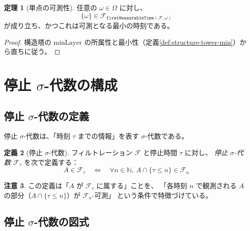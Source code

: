 \documentclass[11pt,a4paper,ja=standard]{ltjsarticle}
\theoremstyle{definition}
\newtheorem{definition}{定義}[section]
\newtheorem{theorem}[definition]{定理}
\newtheorem{remark}[definition]{注意}
\newcommand{\N}{\mathbb{N}}
\newcommand{\F}{\mathcal{F}}
\newcommand{\minLayer}{\mathrm{minLayer}}
\begin{document}
\begin{theorem}[単点の可測性]\label{thm:singleton-measurable}
任意の $\omega \in \Omega$ に対し、
\[
\{\omega\} \in \F_{\mathtt{firstMeasurableTime}(\F, \omega)}
\]
が成り立ち、かつこれは可測となる最小の時刻である。
\end{theorem}

\begin{proof}
構造塔の $\minLayer$ の所属性と最小性（定義\ref{def:structure-tower-min}）から直ちに従う。
\end{proof}

\section{停止 $\sigma$-代数の構成}

\subsection{停止 $\sigma$-代数の定義}

停止 $\sigma$-代数は、「時刻 $\tau$ までの情報」を表す $\sigma$-代数である。

\begin{definition}[停止 $\sigma$-代数]\label{def:stopped-sigma-algebra}
フィルトレーション $\F$ と停止時間 $\tau$ に対し、
\emph{停止 $\sigma$-代数 $\F_\tau$} を次で定義する：
\[
A \in \F_\tau \quad \Longleftrightarrow \quad
\forall n \in \N,\ A \cap \{\tau \le n\} \in \F_n
\]
\end{definition}

\begin{remark}
この定義は「$A$ が $\F_\tau$ に属する」ことを、
「各時刻 $n$ で観測される $A$ の部分（$A \cap \{\tau \le n\}$）が $\F_n$-可測」
という条件で特徴づけている。
\end{remark}

\subsection{停止 $\sigma$-代数の図式}
\end{document}
